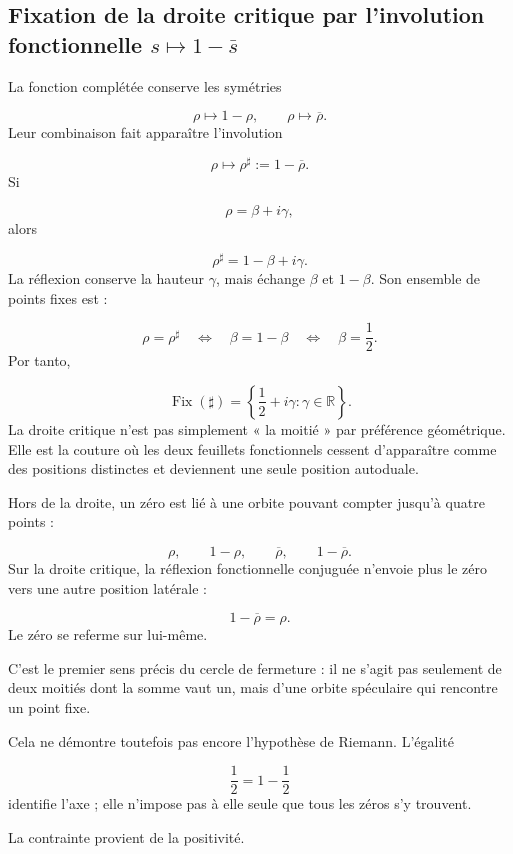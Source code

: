 \subsection{Fixation de la droite critique par l’involution fonctionnelle \(s\mapsto1-\bar s\)}
La fonction complétée conserve les symétries\par
\[
\rho\longmapsto1-\rho,
\qquad
\rho\longmapsto\overline\rho.
\]
Leur combinaison fait apparaître l’involution\par
\[
\rho\longmapsto\rho^\sharp
:=
1-\overline\rho.
\]
Si\par
\[
\rho=\beta+i\gamma,
\]
alors\par
\[
\rho^\sharp
=
1-\beta+i\gamma.
\]
La réflexion conserve la hauteur \(\gamma\), mais échange \(\beta\) et \(1-\beta\). Son ensemble de points fixes est :\par
\[
\rho=\rho^\sharp
\quad\Longleftrightarrow\quad
\beta=1-\beta
\quad\Longleftrightarrow\quad
\beta=\frac12.
\]
Por tanto,\par
\[
\operatorname{Fix}(\sharp)
=
\left\{
\frac12+i\gamma:\gamma\in\mathbb R
\right\}.
\]
La droite critique n’est pas simplement « la moitié » par préférence géométrique. Elle est la couture où les deux feuillets fonctionnels cessent d’apparaître comme des positions distinctes et deviennent une seule position autoduale.\par
Hors de la droite, un zéro est lié à une orbite pouvant compter jusqu’à quatre points :\par
\[
\rho,\qquad
1-\rho,\qquad
\overline\rho,\qquad
1-\overline\rho.
\]
Sur la droite critique, la réflexion fonctionnelle conjuguée n’envoie plus le zéro vers une autre position latérale :\par
\[
1-\overline\rho=\rho.
\]
Le zéro se referme sur lui-même.\par
C’est le premier sens précis du cercle de fermeture : il ne s’agit pas seulement de deux moitiés dont la somme vaut un, mais d’une orbite spéculaire qui rencontre un point fixe.\par
Cela ne démontre toutefois pas encore l’hypothèse de Riemann. L’égalité\par
\[
\frac12=1-\frac12
\]
identifie l’axe ; elle n’impose pas à elle seule que tous les zéros s’y trouvent.\par
La contrainte provient de la positivité.\par
{}
